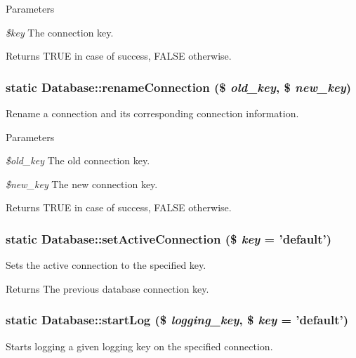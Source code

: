 \begin{DoxyParams}{Parameters}
\item[{\em \$key}]The connection key. \end{DoxyParams}
\begin{DoxyReturn}{Returns}
TRUE in case of success, FALSE otherwise. 
\end{DoxyReturn}
\hypertarget{classDatabase_aa0401fcf5edecc7f81cf32251aeee593}{
\subsubsection[{renameConnection}]{\setlength{\rightskip}{0pt plus 5cm}static Database::renameConnection (\$ {\em old\_\-key}, \/  \$ {\em new\_\-key})}}
\label{classDatabase_aa0401fcf5edecc7f81cf32251aeee593}
Rename a connection and its corresponding connection information.


\begin{DoxyParams}{Parameters}
\item[{\em \$old\_\-key}]The old connection key. \item[{\em \$new\_\-key}]The new connection key. \end{DoxyParams}
\begin{DoxyReturn}{Returns}
TRUE in case of success, FALSE otherwise. 
\end{DoxyReturn}
\hypertarget{classDatabase_afee50f4c59d97ccdcc6c4088adf7bc4e}{
\subsubsection[{setActiveConnection}]{\setlength{\rightskip}{0pt plus 5cm}static Database::setActiveConnection (\$ {\em key} = {\ttfamily 'default'})}}
\label{classDatabase_afee50f4c59d97ccdcc6c4088adf7bc4e}
Sets the active connection to the specified key.

\begin{DoxyReturn}{Returns}
The previous database connection key. 
\end{DoxyReturn}
\hypertarget{classDatabase_a4785b9bc2918dacdcc861b261513715d}{
\subsubsection[{startLog}]{\setlength{\rightskip}{0pt plus 5cm}static Database::startLog (\$ {\em logging\_\-key}, \/  \$ {\em key} = {\ttfamily 'default'})}}
\label{classDatabase_a4785b9bc2918dacdcc861b261513715d}
Starts logging a given logging key on the specified connection.


